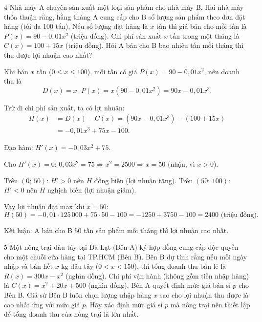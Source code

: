 \separator

\begin{baitoan}{4 \hfill {}}
Nhà máy A chuyên sản xuất một loại sản phẩm cho nhà máy B. Hai nhà máy thỏa thuận rằng, hằng tháng A cung cấp cho B số lượng sản phẩm theo đơn đặt hàng (tối đa 100 tấn). Nếu số lượng đặt hàng là $x$ tấn thì giá bán cho mỗi tấn là $P(x) = 90 - 0{,}01x^2$ (triệu đồng). Chi phí sản xuất $x$ tấn trong một tháng là $C(x) = 100 + 15x$ (triệu đồng). Hỏi A bán cho B bao nhiêu tấn mỗi tháng thì thu được lợi nhuận cao nhất?
\end{baitoan}

\begin{loigiai}
Khi bán $x$ tấn ($0 \le x \le 100$), mỗi tấn có giá $P(x) = 90 - 0{,}01x^2$, nên doanh thu là
\[ D(x) = x \cdot P(x) = x(90 - 0{,}01x^2) = 90x - 0{,}01x^3. \]

Trừ đi chi phí sản xuất, ta có lợi nhuận:
\begin{align*}
H(x) &= D(x) - C(x) = (90x - 0{,}01x^3) - (100 + 15x) \\
      &= -0{,}01x^3 + 75x - 100.
\end{align*}

Đạo hàm: $H'(x) = -0{,}03x^2 + 75$.

Cho $H'(x) = 0$: $0{,}03x^2 = 75 \Rightarrow x^2 = 2500 \Rightarrow x = 50$ (nhận, vì $x > 0$).


Trên $(0;\,50)$: $H' > 0$ nên $H$ đồng biến (lợi nhuận tăng). Trên $(50;\,100)$: $H' < 0$ nên $H$ nghịch biến (lợi nhuận giảm).

Vậy lợi nhuận đạt max khi $x = 50$:
\[ H(50) = -0{,}01 \cdot 125\,000 + 75 \cdot 50 - 100 = -1250 + 3750 - 100 = 2400 \text{ (triệu đồng)}. \]

Kết luận: A bán cho B $\boxed{50}$ tấn sản phẩm mỗi tháng thì lợi nhuận cao nhất.
\end{loigiai}

\separator

\begin{baitoan}{5 \hfill {}}
Một nông trại dâu tây tại Đà Lạt (Bên A) ký hợp đồng cung cấp độc quyền cho một chuỗi cửa hàng tại TP.HCM (Bên B). Bên B dự tính rằng nếu mỗi ngày nhập và bán hết $x$ kg dâu tây ($0 < x < 150$), thì tổng doanh thu bán lẻ là $R(x) = 300x - x^2$ (nghìn đồng). Chi phí vận hành (không gồm tiền nhập hàng) là $C(x) = x^2 + 20x + 500$ (nghìn đồng). Bên A quyết định mức giá bán sỉ $p$ cho Bên B. Giả sử Bên B luôn chọn lượng nhập hàng $x$ sao cho lợi nhuận thu được là cao nhất ứng với mức giá $p$. Hãy xác định mức giá sỉ $p$ mà nông trại nên thiết lập để tổng doanh thu của nông trại là lớn nhất.
\end{baitoan}

